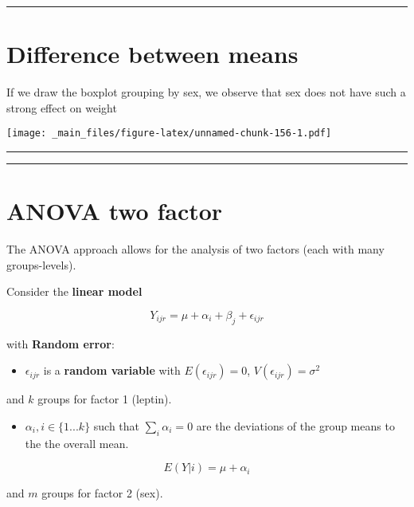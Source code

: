 \documentclass[
]{book}
\providecommand{\tightlist}{%
  \setlength{\itemsep}{0pt}\setlength{\parskip}{0pt}}
\begin{document}
\begin{center}\rule{0.5\linewidth}{0.5pt}\end{center}

\hypertarget{difference-between-means-12}{%
\section{Difference between means}\label{difference-between-means-12}}

If we draw the boxplot grouping by sex, we observe that sex does not have such a strong effect on weight

\texttt{[image: \_main\_files/figure-latex/unnamed-chunk-156-1.pdf]}

\begin{center}\rule{0.5\linewidth}{0.5pt}\end{center}

\begin{center}\rule{0.5\linewidth}{0.5pt}\end{center}

\hypertarget{anova-two-factor-1}{%
\section{ANOVA two factor}\label{anova-two-factor-1}}

The ANOVA approach allows for the analysis of two factors (each with many groups-levels).

Consider the \textbf{linear model}

\[Y_{ijr} = \mu + \alpha_i + \beta_j + \epsilon_{ijr}\]

with \textbf{Random error}:

\begin{itemize}
\tightlist
\item
  \(\epsilon_{ijr}\) is a \textbf{random variable} with \(E(\epsilon_{ijr})=0\), \(V(\epsilon_{ijr})=\sigma^2\)
\end{itemize}

and \(k\) groups for factor 1 (leptin).

\begin{itemize}
\tightlist
\item
  \(\alpha_i, i \in\{1...k\}\) such that \(\sum_i \alpha_i=0\) are the deviations of the group means to the the overall mean.
\end{itemize}

\[E(Y|i)=\mu + \alpha_i\]

and \(m\) groups for factor 2 (sex).
\end{document}
